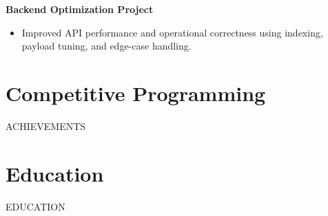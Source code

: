 \documentclass[10pt]{article}
\begin{document}
\textbf{Backend Optimization Project}\\
\begin{itemize}
\item Improved API performance and operational correctness using indexing, payload tuning, and edge-case handling.
\end{itemize}

\section*{Competitive Programming}
{{ACHIEVEMENTS}}

\section*{Education}
{{EDUCATION}}
\end{document}
